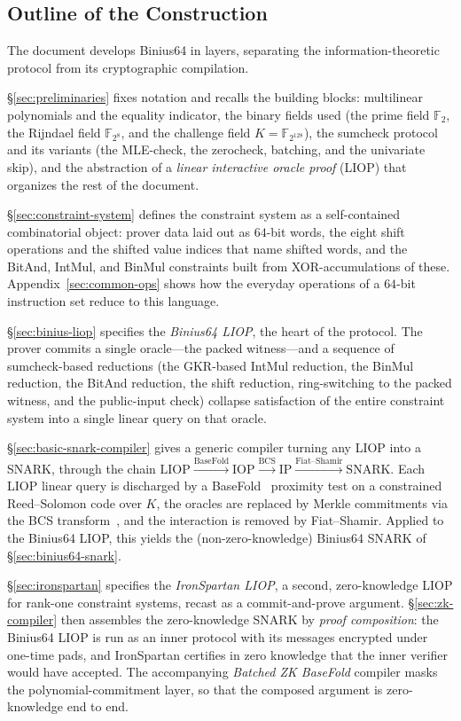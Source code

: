 \documentclass{article}
\theoremstyle{definition}
\newcommand{\FF}[1]{\mathbb{F}_{#1}}
\begin{document}
\subsection{Outline of the Construction}

The document develops Binius64 in layers, separating the information-theoretic protocol from its cryptographic compilation.

\S\ref{sec:preliminaries} fixes notation and recalls the building blocks: multilinear polynomials and the equality indicator, the binary fields used (the prime field $\FF{2}$, the Rijndael field $\FF{2^8}$, and the challenge field $K = \FF{2^{128}}$), the sumcheck protocol and its variants (the MLE-check, the zerocheck, batching, and the univariate skip), and the abstraction of a \emph{linear interactive oracle proof} (LIOP) that organizes the rest of the document.

\S\ref{sec:constraint-system} defines the constraint system as a self-contained combinatorial object: prover data laid out as $64$-bit words, the eight shift operations and the shifted value indices that name shifted words, and the BitAnd, IntMul, and BinMul constraints built from XOR-accumulations of these. Appendix~\ref{sec:common-ops} shows how the everyday operations of a $64$-bit instruction set reduce to this language.

\S\ref{sec:binius-liop} specifies the \emph{Binius64 LIOP}, the heart of the protocol. The prover commits a single oracle---the packed witness---and a sequence of sumcheck-based reductions (the GKR-based IntMul reduction, the BinMul reduction, the BitAnd reduction, the shift reduction, ring-switching to the packed witness, and the public-input check) collapse satisfaction of the entire constraint system into a single linear query on that oracle.

\S\ref{sec:basic-snark-compiler} gives a generic compiler turning any LIOP into a SNARK, through the chain $\text{LIOP} \xrightarrow{\text{BaseFold}} \text{IOP} \xrightarrow{\text{BCS}} \text{IP} \xrightarrow{\text{Fiat--Shamir}} \text{SNARK}$. Each LIOP linear query is discharged by a BaseFold~\cite{Zeilberger:2024aa} proximity test on a constrained Reed--Solomon code over $K$, the oracles are replaced by Merkle commitments via the BCS transform~\cite{Ben-Sasson:2016aa}, and the interaction is removed by Fiat--Shamir. Applied to the Binius64 LIOP, this yields the (non-zero-knowledge) Binius64 SNARK of \S\ref{sec:binius64-snark}.

\S\ref{sec:ironspartan} specifies the \emph{IronSpartan LIOP}, a second, zero-knowledge LIOP for rank-one constraint systems, recast as a commit-and-prove argument. \S\ref{sec:zk-compiler} then assembles the zero-knowledge SNARK by \emph{proof composition}: the Binius64 LIOP is run as an inner protocol with its messages encrypted under one-time pads, and IronSpartan certifies in zero knowledge that the inner verifier would have accepted. The accompanying \emph{Batched ZK BaseFold} compiler masks the polynomial-commitment layer, so that the composed argument is zero-knowledge end to end.
\end{document}
